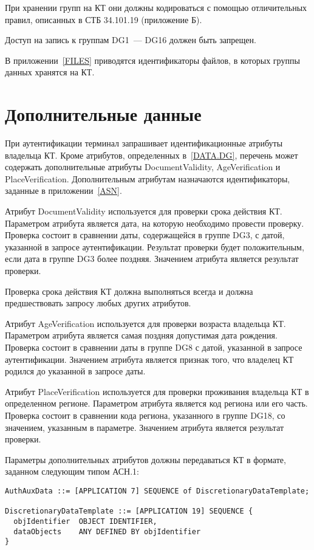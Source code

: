 При хранении групп на КТ они должны кодироваться с помощью отличительных 
правил, описанных в СТБ 34.101.19 (приложение Б). 

Доступ на запись к группам DG1~--- DG16 должен быть запрещен.
 
В приложении~\ref{FILES} приводятся идентификаторы файлов, 
в которых группы данных хранятся на КТ.

\section{Дополнительные данные}\label{DATA.Optional}

При аутентификации терминал запрашивает идентификационные атрибуты
владельца КТ. Кроме атрибутов, определенных в~\ref{DATA.DG}, 
перечень может содержать дополнительные атрибуты DocumentValidity, 
AgeVerification и PlaceVerification. Дополнительным атрибутам назначаются 
идентификаторы, заданные в приложении~\ref{ASN}. 

Атрибут DocumentValidity используется для проверки срока действия КТ. 
Параметром атрибута является дата, на которую необходимо провести 
проверку. Проверка состоит в сравнении даты, содержащейся в группе DG3, с 
датой, указанной в запросе аутентификации. Результат проверки будет 
положительным, если дата в группе DG3 более поздняя. Значением атрибута 
является результат проверки. 

Проверка срока действия КТ должна выполняться всегда и должна предшествовать 
запросу любых других атрибутов. 

Атрибут AgeVerification используется для проверки возраста владельца КТ. 
Параметром атрибута является самая поздняя допустимая дата рождения. 
Проверка состоит в сравнении даты в группе DG8 с датой, указанной в запросе 
аутентификации. Значением атрибута является признак того, что владелец КТ 
родился до указанной в запросе даты. 

Атрибут PlaceVerification используется для проверки проживания владельца 
КТ в определенном регионе. Параметром атрибута является код региона или 
его часть. Проверка состоит в сравнении кода региона, указанного в группе 
DG18, со значением, указанным в параметре. Значением атрибута является 
результат проверки. 

Параметры дополнительных атрибутов должны передаваться КТ в формате, 
заданном следующим типом АСН.1: 

\begin{verbatim}
AuthAuxData ::= [APPLICATION 7] SEQUENCE of DiscretionaryDataTemplate;

DiscretionaryDataTemplate ::= [APPLICATION 19] SEQUENCE {
  objIdentifier  OBJECT IDENTIFIER,
  dataObjects    ANY DEFINED BY objIdentifier
}
\end{verbatim}

